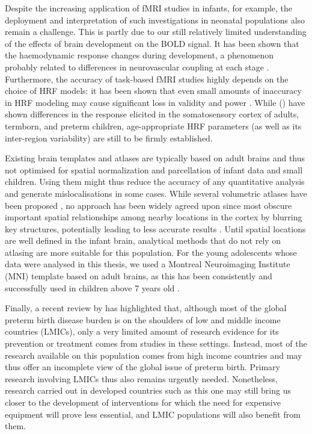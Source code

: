 Despite the increasing application of fMRI studies in infants, for example, the deployment and interpretation of such investigations in neonatal populations also remain a challenge. 
This is partly due to our still relatively limited understanding of the effects of brain development on the BOLD signal. 
It has been shown that the haemodynamic response changes during development, a phenomenon probably related to differences in neurovascular coupling at each stage \citep{Arichi2012}. 
Furthermore, the accuracy of task-based fMRI studies highly depends on the choice of HRF models: it has been shown that even small amounts of inaccuracy in HRF modeling may cause significant loss in validity and power \citep{Lindquist2007, Loh2008}. 
While \citeauthor{Arichi2012} (\citeyear{Arichi2012}) have shown differences in the response elicited in the somatosensory cortex of adults, termborn, and preterm children, age-appropriate HRF parameters (as well as its inter-region variability) are still to be firmly established.


Existing brain templates and atlases are typically based on adult brains and thus not optimised for spatial normalization and parcellation of infant data and small children.
Using them might thus reduce the accuracy of any quantitative analysis and generate mislocalisations in some cases. 
While several volumetric atlases have been proposed \citep{Habas2010, Kazemi2007, Shi2014}, no approach has been widely agreed upon since most obscure important spatial relationships among nearby locations in the cortex by blurring key structures, potentially leading to less accurate results \citep{Li2016}. 
Until spatial locations are well defined in the infant brain, analytical methods that do not rely on atlasing are more suitable for this population. For the young adolescents whose data were analysed in this thesis, we used a Montreal Neuroimaging Institute (MNI) template based on adult brains, as this has been consistently and successfully used in children above 7 years old  \citep{ASHBURNER1998, Burgund2002}. 

Finally, a recent review by \citet{Smid2016} has highlighted that, although most of the global preterm birth disease burden is on the shoulders of low and middle income countries (LMICs), only a very limited amount of research evidence for its prevention or treatment comes from studies in these settings. Instead, most of the research available on this population comes from high income countries and may thus offer an incomplete view of the global issue of preterm birth. Primary research involving LMICs thus also remains urgently needed. Nonetheless, research carried out in developed countries such as this one may still bring us closer to the development of interventions for which the need for expensive equipment will prove less essential, and LMIC populations will also benefit from them.  
